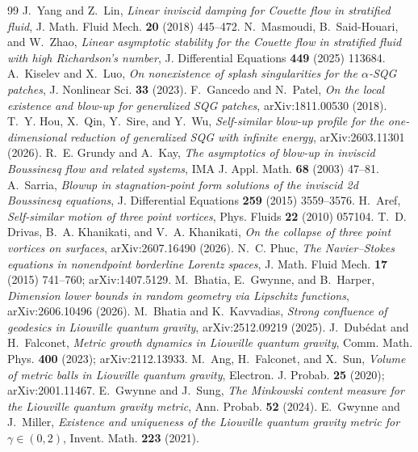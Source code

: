 \documentclass[11pt]{article}
\theoremstyle{definition}
\begin{document}
\begin{thebibliography}{99}
 J.~Yang and Z.~Lin, \emph{Linear inviscid damping for Couette flow in stratified fluid}, J. Math. Fluid Mech. \textbf{20} (2018) 445--472.
 N.~Masmoudi, B.~Said-Houari, and W.~Zhao, \emph{Linear asymptotic stability for the Couette flow in stratified fluid with high Richardson's number}, J. Differential Equations \textbf{449} (2025) 113684.
 A.~Kiselev and X.~Luo, \emph{On nonexistence of splash singularities for the $\alpha$-SQG patches}, J. Nonlinear Sci. \textbf{33} (2023).
 F.~Gancedo and N.~Patel, \emph{On the local existence and blow-up for generalized SQG patches}, arXiv:1811.00530 (2018).
 T.~Y. Hou, X.~Qin, Y.~Sire, and Y.~Wu, \emph{Self-similar blow-up profile for the one-dimensional reduction of generalized SQG with infinite energy}, arXiv:2603.11301 (2026).
 R.~E. Grundy and A.~Kay, \emph{The asymptotics of blow-up in inviscid Boussinesq flow and related systems}, IMA J. Appl. Math. \textbf{68} (2003) 47--81.
 A.~Sarria, \emph{Blowup in stagnation-point form solutions of the inviscid 2d Boussinesq equations}, J. Differential Equations \textbf{259} (2015) 3559--3576.
 H.~Aref, \emph{Self-similar motion of three point vortices}, Phys. Fluids \textbf{22} (2010) 057104.
 T.~D. Drivas, B.~A. Khanikati, and V.~A. Khanikati, \emph{On the collapse of three point vortices on surfaces}, arXiv:2607.16490 (2026).
 N.~C. Phuc, \emph{The Navier--Stokes equations in nonendpoint borderline Lorentz spaces}, J. Math. Fluid Mech. \textbf{17} (2015) 741--760; arXiv:1407.5129.
 M.~Bhatia, E.~Gwynne, and B.~Harper, \emph{Dimension lower bounds in random geometry via Lipschitz functions}, arXiv:2606.10496 (2026).
 M.~Bhatia and K.~Kavvadias, \emph{Strong confluence of geodesics in Liouville quantum gravity}, arXiv:2512.09219 (2025).
 J.~Dub\'edat and H.~Falconet, \emph{Metric growth dynamics in Liouville quantum gravity}, Comm. Math. Phys. \textbf{400} (2023); arXiv:2112.13933.
 M.~Ang, H.~Falconet, and X.~Sun, \emph{Volume of metric balls in Liouville quantum gravity}, Electron. J. Probab. \textbf{25} (2020); arXiv:2001.11467.
 E.~Gwynne and J.~Sung, \emph{The Minkowski content measure for the Liouville quantum gravity metric}, Ann. Probab. \textbf{52} (2024).
 E.~Gwynne and J.~Miller, \emph{Existence and uniqueness of the Liouville quantum gravity metric for $\gamma\in(0,2)$}, Invent. Math. \textbf{223} (2021).

\end{thebibliography}
\end{document}
